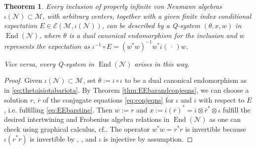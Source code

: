 \documentclass[11pt,a4paper]{article}
\makeatletter
\newcommand{\rbar}{{\overline{r}}}
\newcommand{\iotabar}{{\overline{\iota}}}
\newcommand{\slot}{{\,\cdot \,}}
\newcommand{\E}{\mathcal{E}}
\newcommand{\M}{\mathcal{M}}
\newcommand{\N}{\mathcal{N}}
\DeclareMathOperator{\End}{End}
\DeclareRobustCommand{\cf}{cf.\@\xspace}
\DeclareRobustCommand{\ie}{i.e.\@\xspace}
\DeclareRobustCommand{\Lem}{Lem.\@\xspace}
\DeclareRobustCommand{\eq}{eq.\@\xspace}
\theoremstyle{plain}
\newtheorem{thm}{Theorem}[section]
\theoremstyle{definition}
\theoremstyle{remark}
\numberwithin{equation}{section}%
\makeatother
\begin{document}
\begin{thm}\label{thm:Qsys}
Every inclusion of properly infinite von Neumann algebras $\iota(\N)\subset \M$, with arbitrary centers, together with a given finite index conditional expectation $E\in \E(\M,\iota(\N))$, can be described by a Q-system $(\theta,x,w)$ in $\End(\N)$, where $\theta$ is a dual canonical endomorphism for the inclusion and $w$ represents the expectation as $\iota^{-1}\circ E = (w^*w)^{-1}w^* \iotabar(\slot) w$. 

Vice versa, every Q-system in $\End(\N)$ arises in this way. 
\end{thm}

\begin{proof}
Given $\iota(\N)\subset \M$, set $\theta := \iotabar \circ \iota$ to be a dual canonical endomorphism as in \eqref{eq:thetaisiotabariota}. By Theorem \ref{thm:EEbarandconjeqns}, we can choose a solution $r$, $\rbar$ of the conjugate equations \eqref{eq:conjeqns} for $\iota$ and $\iotabar$ with respect to $E$, \ie fulfilling \eqref{eq:EEbarstine}. Then $w:= r$ and $x:= \iotabar(\rbar)^* = \iotabar \otimes \rbar^* \otimes \iota$ fulfill the desired intertwining and Frobenius algebra relations in $\End(\N)$ as one can check using graphical calculus, \cf \cite[\eq (3.2.1)]{BKLR15}. The operator $w^*w = r^*r$ is invertible because $\iota(r^*r)$ is invertible by \cite[\Lem 2.7]{LoRo97}, \cite[\Lem 8.18]{GiLo19}, and $\iota$ is injective by assumption. 


\end{proof}
\end{document}
